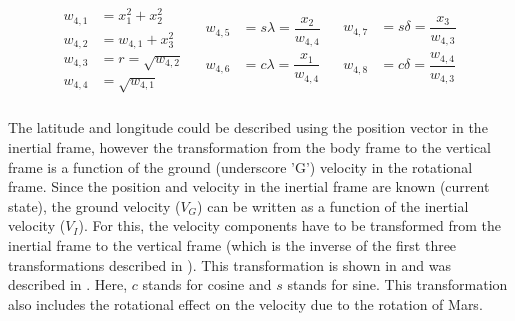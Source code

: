 \begin{align} \label{eq:AuxFtransAngl}
\begin{split}
w_{4,1} &= x_{1}^{2}+x_{2}^{2} \\
w_{4,2} &= w_{4,1}+x_{3}^{2} \\
w_{4,3} &= r = \sqrt{w_{4,2}} \\
w_{4,4} &= \sqrt{w_{4,1}} \\
\end{split}
&
\begin{split}
w_{4,5} &= s\lambda = \dfrac{x_{2}}{w_{4,4}}\\
w_{4,6} &= c\lambda = \dfrac{x_{1}}{w_{4,4}} \\
\end{split}
&
\begin{split}
w_{4,7} &= s\delta = \dfrac{x_{3}}{w_{4,3}} \\
w_{4,8} &= c\delta = \dfrac{w_{4,4}}{w_{4,3}}\\
\end{split} 
\end{align} 


The latitude and longitude could be described using the position vector in the inertial frame, however the transformation from the body frame to the vertical frame is a function of the ground (underscore 'G') velocity in the rotational frame. Since the position and velocity in the inertial frame are known (current state), the ground velocity ($V_{G}$) can be written as a function of the inertial velocity ($V_{I}$). For this, the velocity components have to be transformed from the inertial frame to the vertical frame (which is the inverse of the first three transformations described in ). This transformation is shown in  and was described in \cite{mooij1994motion}. Here, $c$ stands for cosine and $s$ stands for sine. This transformation also includes the rotational effect on the velocity due to the rotation of Mars.
 
